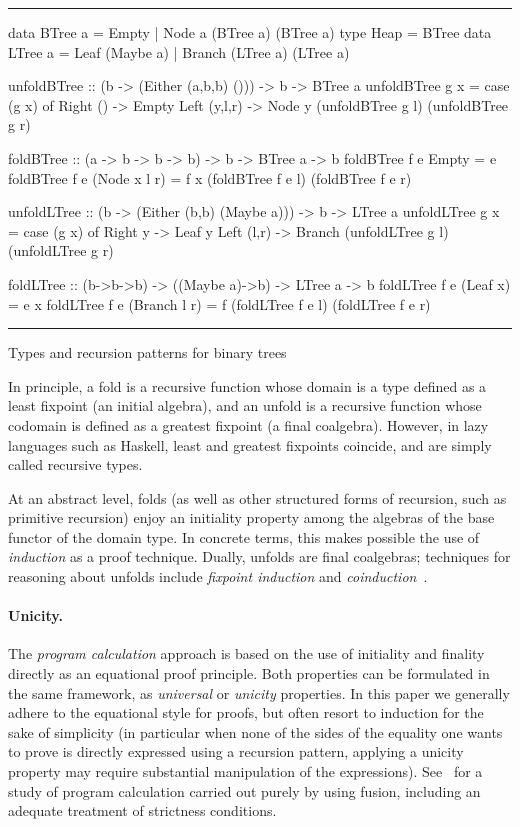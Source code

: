 \documentclass[a4paper,11pt]{llncs}
\begin{document}
\begin{table}[tb]
\hrule
\begin{code}
data BTree a = Empty | Node a (BTree a) (BTree a)
type Heap    = BTree
data LTree a = Leaf (Maybe a) | Branch (LTree a) (LTree a)


unfoldBTree :: (b -> (Either (a,b,b) ())) -> b -> BTree a
unfoldBTree g x = case (g x) of 
            Right ()     -> Empty
            Left (y,l,r) -> Node y (unfoldBTree g l) (unfoldBTree g r)

foldBTree :: (a -> b -> b -> b) -> b -> BTree a -> b
foldBTree f e Empty        = e
foldBTree f e (Node x l r) = f x (foldBTree f e l) (foldBTree f e r)


unfoldLTree :: (b -> (Either (b,b) (Maybe a))) -> b -> LTree a
unfoldLTree g x = case (g x) of
            Right y    -> Leaf y
            Left (l,r) -> Branch (unfoldLTree g l) (unfoldLTree g r)

foldLTree :: (b->b->b) -> ((Maybe a)->b) -> LTree a -> b
foldLTree f e (Leaf x)     = e x
foldLTree f e (Branch l r) = f (foldLTree f e l) (foldLTree f e r)
\end{code}
\hrule
\caption{Types and recursion patterns for binary trees}



\label{tab:trees}
\end{table}


In principle, a fold is a recursive function whose domain is a type
defined as a least fixpoint (an initial algebra), and an unfold is a
recursive function whose codomain is defined as a greatest fixpoint (a
final coalgebra).  However, in lazy languages such as Haskell, least
and greatest fixpoints coincide, and are simply called recursive
types.

At an abstract level, folds (as well as other structured forms of
recursion, such as primitive recursion) enjoy an initiality property
among the algebras of the base functor of the domain type. In concrete
terms, this makes possible the use of \emph{induction} as a proof
technique. Dually, unfolds are final coalgebras; techniques for
reasoning about unfolds include \emph{fixpoint induction} and
\emph{coinduction}~\cite{GibbonsJ:promscp}.


\paragraph{Unicity.}

The \emph{program calculation} approach is based on the use of
initiality and finality directly as an equational proof
principle. Both properties can be formulated in the same framework, as
\emph{universal} or \emph{unicity} properties. In this paper we
generally adhere to the equational style for proofs, but often resort
to induction for the sake of simplicity (in particular when none of
the sides of the equality one wants to prove is directly expressed
using a recursion pattern, applying a unicity property may require
substantial manipulation of the expressions). See~\cite{PintoJS:poipt}
for a study of program calculation carried out purely by using fusion,
including an adequate treatment of strictness conditions.
\end{document}
